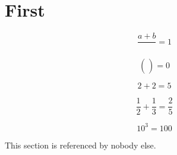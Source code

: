 \documentclass{article}
\begin{document}
\section{First}\label{sec:first}

\[ \frac{a+b}{} = 1 \]

\[ \binom{}{} = 0 \]

\[ 2+2=5 \]

\[ \frac{1}{2}+\frac{1}{3}=\frac{2}{5} \]

\[ 10^{3}=100 \]

This section is referenced by nobody else.
\end{document}
